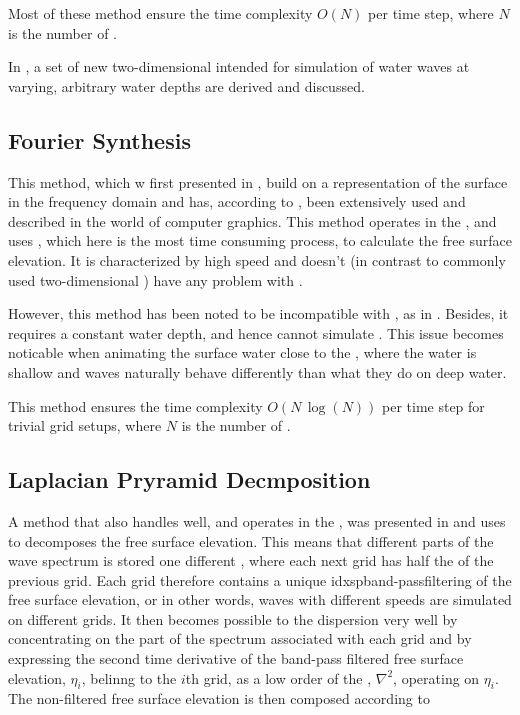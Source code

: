 Most of these method ensure the time complexity $O(N)$ per time step, where $N$ is the number of .

In , a set of new two-dimensional \PDEs intended for simulation of water waves at varying, arbitrary water depths are derived and discussed.

\subsection{Fourier Synthesis}

This method, which w first presented in \citep{Mastin1987}, build on  a representation of the surface in the frequency domain and has, according to \citep{Monnier}, been extensively used and described in the world of computer graphics. This method operates in the , and uses \FFT, which here is the most time consuming process, to calculate the free surface elevation. It is characterized by high speed and doesn't (in contrast to commonly used two-dimensional \PDEs) have any problem with .

However, this method has been noted to be incompatible with \FSI, as in \citep{}. Besides, it requires a constant water depth, and hence cannot simulate . This issue becomes noticable when animating the surface water close to the , where the water is shallow and waves naturally behave differently than what they do on deep water.

This method ensures the time complexity $O(N\,\log(N))$ per time step for trivial grid setups, where $N$ is the number of .

\subsection{Laplacian Pryramid Decmposition}

A method that also handles  well, and operates in the , was presented in \citep{Ottosson2011} and uses \LPD to decomposes the free surface elevation. This means that different parts of the wave spectrum is stored one different \grids, where each next grid has half the \resolution of the previous grid. Each grid therefore contains a unique idxsp{band-pass}{filter}{ing} of the free surface elevation, or in other words, waves with different speeds are simulated on different grids. It then becomes possible to \approximate the dispersion very well by concentrating on the part of the spectrum associated with each grid and by expressing the second time derivative of the band-pass filtered free surface elevation, $\eta_i$, belinng to the $i$th grid, as a low order \polynomial of the , $\nabla^2$, operating on $\eta_i$. The non-filtered free surface elevation is then composed according to

